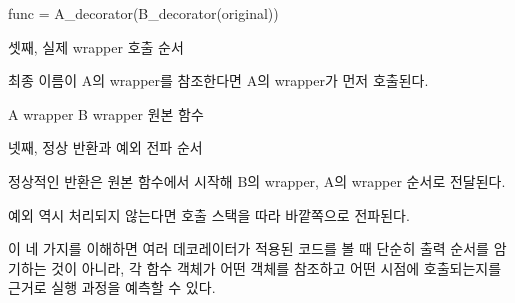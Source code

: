 \begin{dhkcode}
func = A_decorator(B_decorator(original))
\end{dhkcode}

\begin{dhknote}
\begin{dhksmry}[centered]
셋째, 실제 wrapper 호출 순서
\end{dhksmry}
\end{dhknote}

최종 이름이 A의 wrapper를 참조한다면 A의 wrapper가 먼저 호출된다.

\begin{dhksmry}[centered]
A wrapper \ra B wrapper \ra 원본 함수
\end{dhksmry}

\begin{dhknote}
\begin{dhksmry}[centered]
넷째, 정상 반환과 예외 전파 순서
\end{dhksmry}
\end{dhknote}

정상적인 반환은 원본 함수에서 시작해 B의 wrapper, A의 wrapper 순서로 전달된다.

예외 역시 처리되지 않는다면 호출 스택을 따라 바깥쪽으로 전파된다.

이 네 가지를 이해하면 여러 데코레이터가 적용된 코드를 볼 때 단순히 출력 순서를 암기하는 것이 아니라, 각 함수 객체가 어떤 객체를 참조하고 어떤 시점에 호출되는지를 근거로 실행 과정을 예측할 수 있다.
